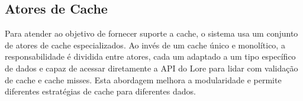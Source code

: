 \subsection{Atores de Cache}

Para atender ao objetivo de fornecer suporte a cache, o sistema usa um conjunto de atores de cache especializados. Ao invés de um cache único e monolítico, a responsabilidade é dividida entre atores, cada um adaptado a um tipo específico de dados e capaz de acessar diretamente a API do Lore para lidar com validação de cache e cache misses. Esta abordagem melhora a modularidade e permite diferentes estratégias de cache para diferentes dados.
